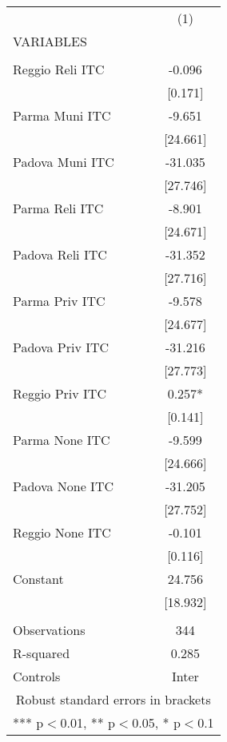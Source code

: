 \begin{tabular}{lc} \hline
 & (1) \\
VARIABLES &  \\ \hline
 &  \\
Reggio Reli ITC & -0.096 \\
 & [0.171] \\
Parma Muni ITC & -9.651 \\
 & [24.661] \\
Padova Muni ITC & -31.035 \\
 & [27.746] \\
Parma Reli ITC & -8.901 \\
 & [24.671] \\
Padova Reli ITC & -31.352 \\
 & [27.716] \\
Parma Priv ITC & -9.578 \\
 & [24.677] \\
Padova Priv ITC & -31.216 \\
 & [27.773] \\
Reggio Priv ITC & 0.257* \\
 & [0.141] \\
Parma None ITC & -9.599 \\
 & [24.666] \\
Padova None ITC & -31.205 \\
 & [27.752] \\
Reggio None ITC & -0.101 \\
 & [0.116] \\
Constant & 24.756 \\
 & [18.932] \\
 &  \\
Observations & 344 \\
R-squared & 0.285 \\
 Controls & Inter \\ \hline
\multicolumn{2}{c}{ Robust standard errors in brackets} \\
\multicolumn{2}{c}{ *** p$<$0.01, ** p$<$0.05, * p$<$0.1} \\
\end{tabular}
